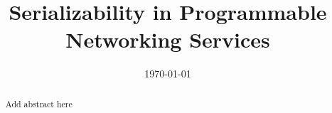 \documentclass[noacm,acmsmall,anonymous]{acmart}
\title{Serializability in Programmable Networking Services}
\author{}
\date{\today}
\let\oldmaketitle\maketitle
\renewcommand{\maketitle}{
	\oldmaketitle
	\pagestyle{plain}  %
	\thispagestyle{plain}  %
}
\begin{document}
	


\begin{abstract}
        Add abstract here
\end{abstract}

\maketitle













\newpage

{
	
	
}

\newpage
\appendix
\renewcommand{\thesection}{\Alph{section}}

%
%
\end{document}

